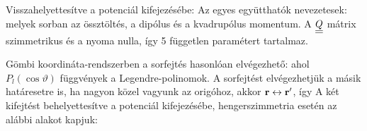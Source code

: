    Visszahelyettesítve a potenciál kifejezésébe:
   Az egyes együtthatók nevezetesek:
   melyek sorban az össztöltés, a dipólus és a kvadrupólus momentum. A $\underline{\underline{Q}}$ mátrix szimmetrikus és a nyoma nulla, így 5 független paramétert tartalmaz. 
   
   Gömbi koordináta-rendszerben a sorfejtés hasonlóan elvégezhető:
   ahol $P_l(\cos\vartheta)$ függvények a Legendre-polinomok. A sorfejtést elvégezhetjük a másik határesetre is, ha nagyon közel vagyunk az origóhoz, akkor $\mathbf{r}\leftrightarrow\mathbf{r}'$, így 
   A két kifejtést behelyettesítve a potenciál kifejezésébe, hengerszimmetria esetén az alábbi alakot kapjuk:
   
